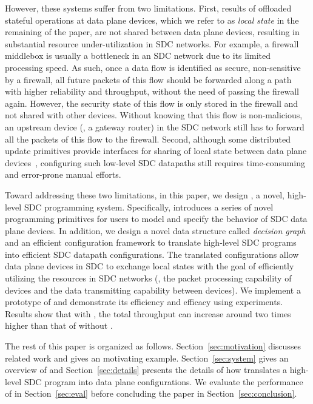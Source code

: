 However, these systems
suffer from two limitations. First, results of offloaded stateful operations at
data plane devices, which we refer to as \textit{local state} in the remaining
of the paper, are not shared between data plane devices, resulting in
substantial resource under-utilization in SDC networks. For example, a firewall
middlebox is usually a bottleneck in an SDC network due to its
limited processing speed. As such, once a data
flow is identified as secure, non-sensitive by a firewall, all future packets of
this flow should be forwarded along a path with higher reliability and throughput, without the need
of passing the firewall again. However, the security state of this flow is only
stored in the firewall and not shared with other devices. 
Without knowing that this flow is non-malicious, an upstream
device (\eg, a gateway router) in the SDC network still has to forward all the
packets of this flow to the firewall. Second, although some distributed
update primitives provide interfaces for sharing of local state between data
plane devices~\cite{ddp}, configuring such low-level SDC datapaths still
requires time-consuming and error-prone manual efforts.

Toward addressing these two limitations, in this paper, we design \concept{}, a
novel, high-level SDC programming system. Specifically,
\concept{} introduces a series of novel programming primitives for users to
model and specify the behavior of SDC data plane devices. In addition, we design
a novel data structure called \textit{decision graph} and an efficient
configuration framework to translate high-level SDC programs into
efficient SDC datapath configurations. The translated configurations allow data
plane devices in SDC to exchange local states with the goal of efficiently
utilizing the resources in SDC networks (\eg, the packet processing capability
of devices and the data transmitting capability between devices). We implement a prototype of \concept{} and demonstrate its efficiency and efficacy using experiments. Results show that with \concept{}, the total
throughput can increase around two times higher than that of without
\concept{}.

The rest of this paper is organized as follows. Section~\ref{sec:motivation}
discusses related work and gives an motivating example. 
 Section~\ref{sec:system} gives an overview of \concept{} and Section~\ref{sec:details}
 presents the details of how \concept{} translates a high-level SDC program into data plane configurations. We evaluate the
 performance of \concept{} in Section~\ref{sec:eval} before concluding the paper
 in Section~\ref{sec:conclusion}.







